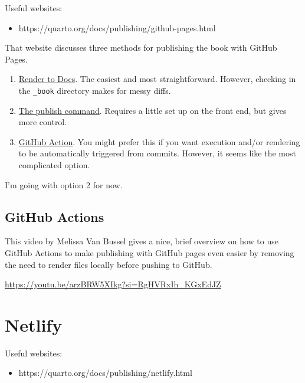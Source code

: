 \documentclass[
  letterpaper,
  DIV=11,
  numbers=noendperiod]{scrreprt}
\providecommand{\tightlist}{%
  \setlength{\itemsep}{0pt}\setlength{\parskip}{0pt}}\usepackage{longtable,booktabs,array}
\begin{document}
Useful websites:

\begin{itemize}
\tightlist
\item
  https://quarto.org/docs/publishing/github-pages.html
\end{itemize}

That website discusses three methods for publishing the book with GitHub
Pages.

\begin{enumerate}
\def\labelenumi{\arabic{enumi}.}
\item
  \href{https://quarto.org/docs/publishing/github-pages.html\#render-to-docs}{Render
  to Docs}. The easiest and most straightforward. However, checking in
  the \texttt{\_book} directory makes for messy diffs.
\item
  \href{https://quarto.org/docs/publishing/github-pages.html\#publish-command}{The
  publish command}. Requires a little set up on the front end, but gives
  more control.
\item
  \href{https://quarto.org/docs/publishing/github-pages.html\#github-action}{GitHub
  Action}. You might prefer this if you want execution and/or rendering
  to be automatically triggered from commits. However, it seems like the
  most complicated option.
\end{enumerate}

I'm going with option 2 for now.

\subsection{GitHub Actions}\label{github-actions}

This video by Melissa Van Bussel gives a nice, brief overview on how to
use GitHub Actions to make publishing with GitHub pages even easier by
removing the need to render files locally before pushing to GitHub.

\url{https://youtu.be/arzBRW5XIkg?si=RgHVRxIh_KGxEdJZ}

\section{Netlify}\label{netlify}

Useful websites:

\begin{itemize}
\tightlist
\item
  https://quarto.org/docs/publishing/netlify.html
\end{itemize}
\end{document}
